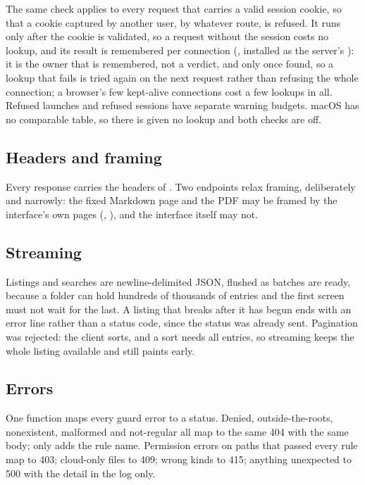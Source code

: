 The same check applies to every request that carries a valid session cookie, so that a
cookie captured by another user, by whatever route, is refused.  It runs only after
the cookie is validated, so a request without the session costs no lookup, and its
result is remembered per connection (, installed as the
server's ): it is the owner that is remembered, not a verdict, and
only once found, so a lookup that fails is tried again on the next request rather
than refusing the whole connection; a browser's few kept-alive connections cost a few
lookups in all.  Refused launches and refused sessions have separate warning budgets.  macOS has no
comparable table, so there  is given no lookup and both checks are
off.

\subsection{Headers and framing}

Every response carries the headers of .  Two endpoints relax framing, deliberately
and narrowly: the fixed Markdown page and the PDF may be framed by the interface's own pages
(, ), and the interface itself
may not.

\subsection{Streaming}

Listings and searches are newline-delimited JSON, flushed as batches are ready, because a
folder can hold hundreds of thousands of entries and the first screen must not wait for the
last.  A listing that breaks after it has begun ends with an error line rather than a status
code, since the status was already sent.  Pagination was rejected: the client sorts, and a
sort needs all entries, so streaming keeps the whole listing available and still paints early.

\subsection{Errors}

One function maps every guard error to a status.  Denied, outside-the-roots, nonexistent,
malformed and not-regular all map to the same 404 with the same body; only  adds
the rule name.  Permission errors on paths that passed every rule map to 403; cloud-only files to
409; wrong kinds to 415; anything unexpected to 500 with the detail in the log only.

